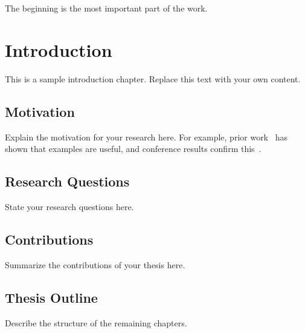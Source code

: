 
\begin{savequote}[75mm]
The beginning is the most important part of the work.
\end{savequote}

\chapter{Introduction}
\label{ch:introduction}

This is a sample introduction chapter. Replace this text with your own content.

\section{Motivation}

Explain the motivation for your research here. For example, prior work~\cite{example2024} has shown that examples are useful, and conference results confirm this~\cite{example_conf2024}.

\section{Research Questions}

State your research questions here.

\section{Contributions}

Summarize the contributions of your thesis here.

\section{Thesis Outline}

Describe the structure of the remaining chapters.
